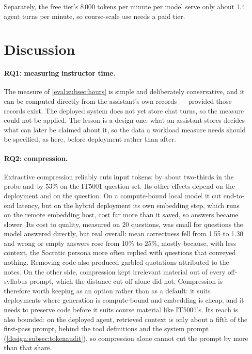 Separately, the free tier's 8\,000 tokens per minute per model serve only
about 1.4 agent turns per minute, so course-scale use needs a paid tier.

\section{Discussion}
\label{eval:sec:discussion}

\paragraph{RQ1: measuring instructor time.} The measure of
\autoref{eval:subsec:hours} is simple and deliberately conservative, and it
can be computed directly from the assistant's own records --- provided those
records exist. The deployed system does not yet store chat turns, so the
measure could not be applied. The lesson is a design one: what an assistant
stores decides what can later be claimed about it, so the data a workload
measure needs should be specified, as here, before deployment rather than
after.

\paragraph{RQ2: compression.} Extractive compression reliably cuts input
tokens: by about two-thirds in the probe and by 53\% on the IT5001 question
set. Its other effects depend on the deployment and on the question. On a
compute-bound local model it cut end-to-end latency, but on the hybrid
deployment its own embedding step, which runs on the remote embedding host,
cost far more than it saved, so answers became slower. Its cost to quality,
measured on 20 questions, was small for questions the model answered
directly, but real overall: mean correctness fell from 1.55 to 1.30 and wrong
or empty answers rose from 10\% to 25\%, mostly because, with less context,
the Socratic persona more often replied with questions that conveyed nothing.
Removing code also produced garbled quotations attributed to the notes. On
the other side, compression kept irrelevant material out of every
off-syllabus prompt, which the distance cut-off alone did not. Compression is
therefore worth keeping as an option rather than as a default: it suits
deployments where generation is compute-bound and embedding is cheap, and it
needs to preserve code before it suits course material like IT5001's. Its
reach is also bounded: on the deployed agent, retrieved context is only about a fifth of
the first-pass prompt, behind the tool definitions and the system prompt
(\autoref{design:subsec:tokenaudit}), so compression alone cannot cut the
prompt by more than that share.

